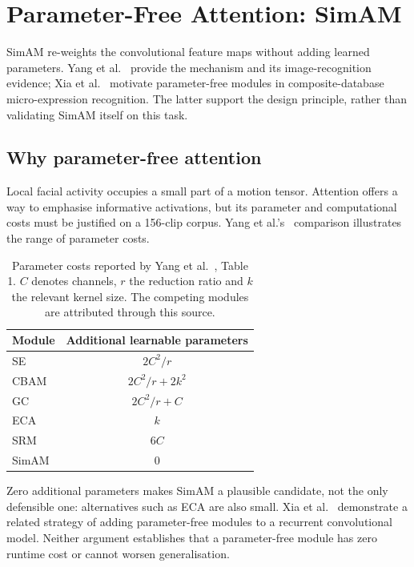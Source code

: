 \section{Parameter-Free Attention: SimAM}
\label{sec:simam-review}

SimAM re-weights the convolutional feature maps without adding learned parameters. Yang et al.~\cite{yang2021} provide the mechanism and its image-recognition evidence; Xia et al.~\cite{xia2020b} motivate parameter-free modules in composite-database micro-expression recognition. The latter support the design principle, rather than validating SimAM itself on this task.

\subsection{Why parameter-free attention}
\label{sec:simam-why}

Local facial activity occupies a small part of a motion tensor. Attention offers a way to emphasise informative activations, but its parameter and computational costs must be justified on a 156-clip corpus. Yang et al.'s~\cite{yang2021} comparison illustrates the range of parameter costs.

\begin{table}[htbp]
    \centering
    \small
    \begin{tabular}{@{}lc@{}}
        \hline
        \textbf{Module} & \textbf{Additional learnable parameters} \\
        \hline
        SE & $2C^2/r$ \\
        CBAM & $2C^2/r+2k^2$ \\
        GC & $2C^2/r+C$ \\
        ECA & $k$ \\
        SRM & $6C$ \\
        SimAM & $0$ \\
        \hline
    \end{tabular}
    \caption[Parameter costs of attention modules]{Parameter costs reported by Yang et al.~\cite{yang2021}, Table 1. $C$ denotes channels, $r$ the reduction ratio and $k$ the relevant kernel size. The competing modules are attributed through this source.}
    \label{tab:attention-modules}
\end{table}

Zero additional parameters makes SimAM a plausible candidate, not the only defensible one: alternatives such as ECA are also small. Xia et al.~\cite{xia2020b} demonstrate a related strategy of adding parameter-free modules to a recurrent convolutional model. Neither argument establishes that a parameter-free module has zero runtime cost or cannot worsen generalisation.

